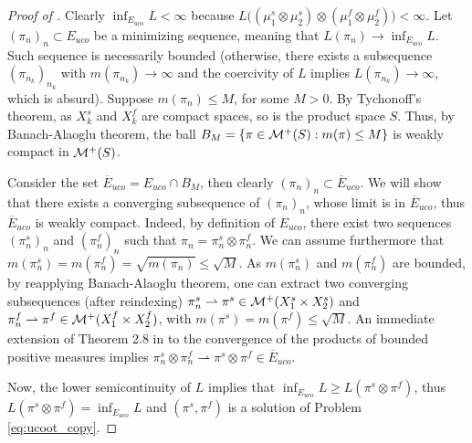 \begin{proof}[Proof of ]
  Clearly $\inf_{E_{uco}} L < \infty$ because
  $L\big( (\mu_1^s \otimes \mu_2^s) \otimes (\mu_1^f \otimes \mu_2^f) \big) < \infty$.
  Let $(\pi_n)_n \subset {E_{uco}}$ be a minimizing sequence, meaning that
  $L(\pi_n) \to \inf_{E_{uco}} L$.
  Such sequence is necessarily bounded (otherwise, there exists a subsequence $(\pi_{n_k})_{n_k}$
  with $m(\pi_{n_k}) \to \infty$ and the coercivity of $L$ implies $L(\pi_{n_k}) \to \infty$,
  which is absurd). Suppose $m(\pi_{n}) \leq M$, for some $M > 0$. By Tychonoff's theorem,
  as $X_k^s$ and $X_k^f$ are compact spaces,
  so is the product space $S$. Thus, by Banach-Alaoglu theorem,
  the ball $B_M = \{ \pi \in \mathcal M^+(S): m(\pi) \leq M \}$
  is weakly compact in $\mathcal M^+(S)$.

  Consider the set $\overline{E}_{uco} = E_{uco} \cap B_M$, then clearly
  $(\pi_n)_n \subset \overline{E}_{uco}$. We will show that
  there exists a converging subsequence of $(\pi_n)_n$, whose limit is in $\overline{E}_{uco}$,
  thus $\overline{E}_{uco}$ is weakly compact. Indeed, by definition of $E_{uco}$,
  there exist two sequences $(\pi_n^s)_n$ and $(\pi_n^f)_n$ such that
  $\pi_n = \pi_n^s \otimes \pi_n^f$.
  We can assume furthermore that $m(\pi_n^s) = m(\pi_n^f) = \sqrt{m(\pi_n)} \leq \sqrt M$.
  As $m(\pi_n^s)$ and $m(\pi_n^f)$ are bounded, by reapplying Banach-Alaoglu theorem,
  one can extract two converging subsequences (after reindexing)
  $\pi_n^s \rightharpoonup \pi^s \in \mathcal M^+(X_1^s \times X_2^s)$ and
  $\pi_n^f \rightharpoonup \pi^f \in \mathcal M^+(X_1^f \times X_2^f)$,
  with $m(\pi^s) = m(\pi^f) \leq \sqrt{M}$.
  An immediate extension of Theorem 2.8 in \citep{Billingsley99} to the convergence of
  the products of bounded positive measures implies
  $\pi_n^s \otimes \pi_n^f \rightharpoonup \pi^s \otimes \pi^f \in \overline{E}_{uco}$.

  Now, the lower semicontinuity of $L$ implies that $\inf_{E_{uco}} L \geq L(\pi^s \otimes \pi^f)$,
  thus $L(\pi^s \otimes \pi^f) = \inf_{E_{uco}} L$ and $(\pi^s, \pi^f)$
  is a solution of Problem \eqref{eq:ucoot_copy}.
\end{proof}

